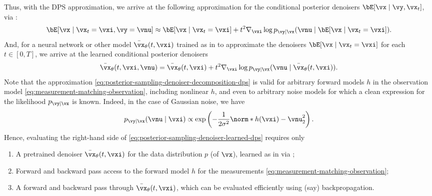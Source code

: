 \documentclass[../../book-main.tex]{subfiles}
\begin{document}
Thus, with the DPS approximation, we arrive at the following approximation for
the conditional posterior denoisers $\bE[\vx \mid \vy, \vx_t]$, via
:
\begin{equation}
    \bE[ \vx \mid \vx_t=\vxi, \vy=\vnu]
    \approx
    \bE[\vx \mid \vx_t=\vxi]
    + t^2 \nabla_{\vxi} \log p_{\vy \mid \vx}(\vnu \mid \bE[\vx \mid
    \vx_t = \vxi]).
    \label{eq:posterior-sampling-denoiser-decomposition-dps}
\end{equation}
And, for a neural network or other model $\bar{\vx}_{\theta}(t, \vxi)$
trained as in  to approximate the denoisers
$\bE[\vx \mid \vx_t = \vxi]$ for each $t \in [0, T]$, we arrive at the learned
conditional posterior denoisers
\begin{equation}
    \bar{\vx}_{\theta}(t, \vxi, \vnu)
    = \bar{\vx}_{\theta}(t, \vxi)
    + t^2 \nabla_{\vxi} \log p_{\vy \mid \vx}(\vnu \mid \bar{\vx}_{\theta}(t,
    \vxi)).
    \label{eq:posterior-sampling-denoiser-learned-dps}
\end{equation}
Note that the approximation
\eqref{eq:posterior-sampling-denoiser-decomposition-dps} is valid for arbitrary
forward models $h$ in the
observation model \eqref{eq:measurement-matching-observation}, including
nonlinear $h$, and even to
arbitrary noise models for which a clean expression for the likelihood $p_{\vy
\mid \vx}$ is known. Indeed, in the case of Gaussian noise, we have
\begin{equation}
    p_{\vy \mid \vx}(\vnu \mid \vxi)
    \propto
    \exp\left(
        -\frac{1}{2\sigma^2} \norm*{ h(\vxi) - \vnu }_2^2
    \right).
\end{equation}
Hence, evaluating the right-hand side of
\eqref{eq:posterior-sampling-denoiser-learned-dps}
requires only
\begin{enumerate}
    \item A pretrained denoiser $\bar{\vx}_{\theta}(t, \vxi)$ for the
        data distribution $p$
        (of $\vx$), learned as in  via
        ;
    \item Forward and backward pass access to the forward model $h$ for the
        measurements \eqref{eq:measurement-matching-observation};
    \item A forward and backward pass through $\bar{\vx}_{\theta}(t,
        \vxi)$, which can be evaluated
        efficiently using (say) backpropagation.
\end{enumerate}
\end{document}
